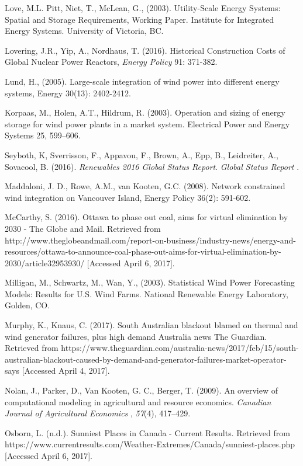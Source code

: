 Love, M.L. Pitt, Niet, T., McLean, G., (2003). Utility-Scale Energy
Systems: Spatial and Storage Requirements, Working Paper. Institute for
Integrated Energy Systems. University of Victoria, BC.

Lovering, J.R., Yip, A., Nordhaus, T. (2016). Historical Construction
Costs of Global Nuclear Power Reactors, \emph{Energy Policy} 91:
371-382.

Lund, H., (2005). Large-scale integration of wind power into different
energy systems, Energy 30(13): 2402-2412.

Korpaas, M., Holen, A.T., Hildrum, R. (2003). Operation and sizing of
energy storage for wind power plants in a market system. Electrical
Power and Energy Systems 25, 599--606.

Seyboth, K, Sverrisson, F., Appavou, F., Brown, A., Epp, B., Leidreiter,
A., Sovacool, B. (2016). \emph{Renewables 2016 Global Status Report}.
\emph{Global Status Report} .

Maddaloni, J. D., Rowe, A.M., van Kooten, G.C. (2008). Network
constrained wind integration on Vancouver Island, Energy Policy 36(2):
591-602.

McCarthy, S. (2016). Ottawa to phase out coal, aims for virtual
elimination by 2030 - The Globe and Mail. Retrieved from
http://www.theglobeandmail.com/report-on-business/industry-news/energy-and-resources/ottawa-to-announce-coal-phase-out-aims-for-virtual-elimination-by-2030/article32953930/
{[}Accessed April 6, 2017{]}.

Milligan, M., Schwartz, M., Wan, Y., (2003). Statistical Wind Power
Forecasting Models: Results for U.S. Wind Farms. National Renewable
Energy Laboratory, Golden, CO.

Murphy, K., Knaus, C. (2017). South Australian blackout blamed on
thermal and wind generator failures, plus high demand \textbar{}
Australia news \textbar{} The Guardian. Retrieved from
https://www.theguardian.com/australia-news/2017/feb/15/south-australian-blackout-caused-by-demand-and-generator-failures-market-operator-says
{[}Accessed April 4, 2017{]}.

Nolan, J., Parker, D., Van Kooten, G. C., Berger, T. (2009). An overview
of computational modeling in agricultural and resource economics.
\emph{Canadian Journal of Agricultural Economics} , \emph{57}(4),
417--429.

Osborn, L. (n.d.). Sunniest Places in Canada - Current Results.
Retrieved from
https://www.currentresults.com/Weather-Extremes/Canada/sunniest-places.php
{[}Accessed April 6, 2017{]}.

